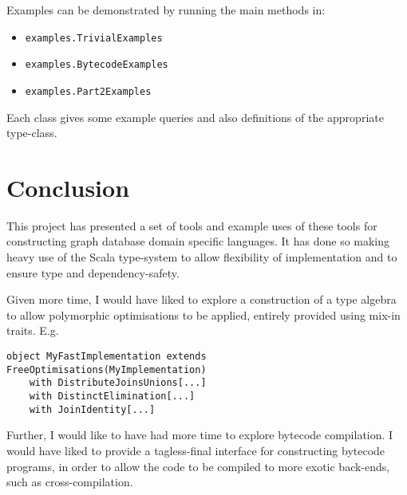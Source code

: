\documentclass{report}
\newcommand \2[0]{\textbf{2}}
\newcommand \3[0]{\textbf{3}}
\begin{document}
Examples can be demonstrated by running the main methods in:
\begin{itemize}
    \item \texttt{examples.TrivialExamples}
    \item \texttt{examples.BytecodeExamples}
    \item \texttt{examples.Part2Examples}
\end{itemize} 
Each class gives some example queries and also definitions of the appropriate type-class.


\chapter{Conclusion}
This project has presented a set of tools and example uses of these tools for constructing graph database domain specific languages. It has done so making heavy use of the Scala type-system to allow flexibility of implementation and to ensure type and dependency-safety.

Given more time, I would have liked to explore a construction of a type algebra to allow polymorphic optimisations to be applied, entirely provided using mix-in traits. E.g.

\begin{verbatim}
object MyFastImplementation extends FreeOptimisations(MyImplementation) 
    with DistributeJoinsUnions[...]
    with DistinctElimination[...]
    with JoinIdentity[...]
\end{verbatim}

Further, I would like to have had more time to explore bytecode compilation. I would have liked to provide a tagless-final interface for constructing bytecode programs, in order to allow the code to be compiled to more exotic back-ends, such as cross-compilation.
    
\end{document}
